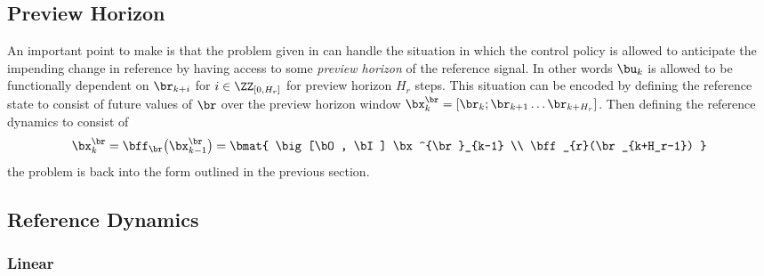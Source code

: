 \subsection{Preview Horizon}
An important point to make is that the problem given in  can handle the situation in which the control policy is allowed to anticipate the impending change in reference by having access to some \textit{preview horizon} of the reference signal. In other words $\bu_k$ is allowed to be functionally dependent on $\br_{k+i}$ for $i \in \ZZ_{[0,H_r]}$ for preview horizon $H_r$ steps. This situation can be encoded by defining the reference state to consist of future values of $\br$ over the preview horizon window $\bx^{\br}_k = [\br_k; \br_{k+1} \dots \br_{k+H_r}]$. Then defining the reference dynamics to consist of
\begin{equation}
\bx^{\br}_k = \bff_{\br}\big( \bx^{\br}_{k-1} \big) = \bmat{
\big[\bO, \bI] \bx^{\br}_{k-1} \\
\bff_{r}(\br_{k+H_r-1})
}
\end{equation}
the problem is back into the form outlined in the previous section. 




\subsection{Reference Dynamics}
\subsubsection{Linear}

